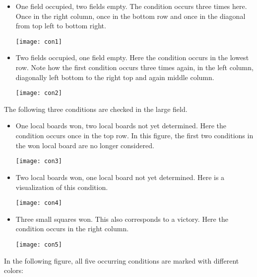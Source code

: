 \begin{itemize}
\item One field occupied, two fields empty. The condition occurs three times here. Once in the right column, once in the bottom row and once in the diagonal from top left to bottom right.\\
\begin{fixedpic}
	\centering
	\texttt{[image: con1]}
\end{fixedpic}
\item Two fields occupied, one field empty. Here the condition occurs in the lowest row. Note how the first condition occurs three times again, in the left column, diagonally left bottom to the right top and again middle column.
\begin{fixedpic}
	\centering
	\texttt{[image: con2]}
\end{fixedpic}
\end{itemize}
The following three conditions are checked in the large field.\\
\begin{itemize}
\item One local boards won, two local boards not yet determined. Here the condition occurs once in the top row. In this figure, the first two conditions in the won local board are no longer considered.\\
\begin{fixedpic}
	\centering
	\texttt{[image: con3]}
\end{fixedpic}
\item Two local boards won, one local board not yet determined. Here is a visualization of this condition.\\
\begin{fixedpic}
	\centering
	\texttt{[image: con4]}
\end{fixedpic}
\item Three small squares won. This also corresponds to a victory. Here the condition occurs in the right column.\\
\begin{fixedpic}
	\centering
	\texttt{[image: con5]}
\end{fixedpic}
\end{itemize}
In the following figure, all five occurring conditions are marked with different colors:
